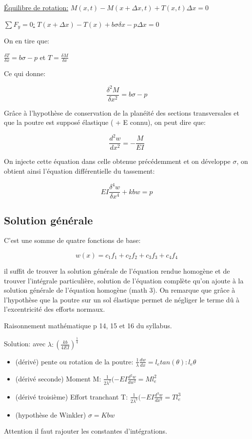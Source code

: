 \underline{Équilibre de rotation:} $M(x,t)-M(x+\Delta x,t)+T(x,t)\Delta x =0$

\underline{$\sum F_y = 0$:} $T(x+\Delta x)-T(x) + b \sigma \delta x - p \Delta x =0$

On en tire que: 

\begin{center}
 $\frac{\delta T}{\delta x} = b \sigma-p $   \smallskip    et      $ T=\frac{\delta M}{\delta x} $ 
 \end{center}

Ce qui donne:

$$ \frac{\delta ^2 M}{\delta x^2} = b \sigma-p $$

Grâce à l'hypothèse de conservation de la planéité des sections transversales et que la poutre est supposé élastique ( + E connu), on peut dire que: 

$$ \frac{d ^2 w}{d x^2} = -\frac{M}{E I} $$

On injecte cette équation dans celle obtenue précédemment et on développe $\sigma$, on obtient ainsi l'équation différentielle du tassement:

$$ E I \frac{\delta ^4w}{\delta x^4}+kbw = p$$ 

\subsection{Solution générale}

C'est une somme de quatre fonctions de base:

$$ w(x) = c_1 f_1 + c_2 f_2 + c_3 f_3 + c_4 f_4 $$

il suffit de trouver la solution générale de l'équation rendue homogène et de trouver l'intégrale particulière, solution de l'équation complète qu'on ajoute à la solution générale de l'équation homogène (math 3). On remarque que grâce à l'hypothèse que la poutre sur un sol élastique permet de négliger le terme dû à l'excentricité des efforts normaux.

Raisonnement mathématique p 14, 15 et 16 du syllabus.

Solution:   avec $\lambda : (\frac{kb}{4 EI})^\frac{1}{4}$ 

\begin{itemize}
    \item (dérivé) pente ou rotation de la poutre: $\frac{1}{\lambda}\frac{dw}{dx} = l_e tan(\theta) : l_e \theta $
    \item (dérivé seconde) Moment M: $\frac{1}{2\lambda^2}(-EI\frac{d^2w}{dw^2} = M l_e^2$
    \item (dérivé troisième) Effort tranchant T: $\frac{1}{2\lambda^3}(-EI\frac{d^3w}{dx^3} = Tl^3_e$
    \item (hypothèse de Winkler) $\sigma = Kbw$
\end{itemize}
Attention il faut rajouter les constantes d'intégrations.

